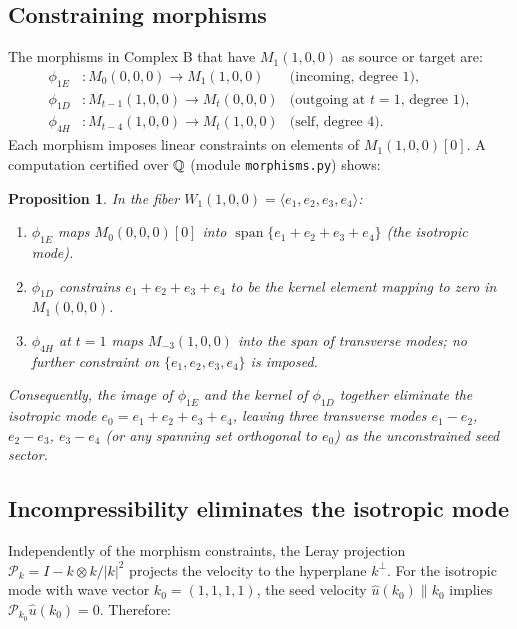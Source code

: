 \documentclass[reqno,10pt]{amsart}
\theoremstyle{plain}
\newtheorem{proposition}[theorem]{Proposition}
\theoremstyle{definition}
\begin{document}
\subsection{Constraining morphisms}

The morphisms in Complex B that have $M_1(1,0,0)$ as source or target are:
\begin{align*}
  \phi_{1E} &: M_0(0,0,0) \to M_1(1,0,0) & \text{(incoming, degree 1)},\\
  \phi_{1D} &: M_{t-1}(1,0,0) \to M_t(0,0,0) & \text{(outgoing at } t=1\text{, degree 1)},\\
  \phi_{4H} &: M_{t-4}(1,0,0) \to M_t(1,0,0) & \text{(self, degree 4)}.
\end{align*}
Each morphism imposes linear constraints on elements of $M_1(1,0,0)[0]$.
A computation certified over ${\mathbb{Q}}$ (module \texttt{morphisms.py}) shows:

\begin{proposition}\label{prop:constraints}
  In the fiber $W_1(1,0,0) = \langle e_1,e_2,e_3,e_4\rangle$:
  \begin{enumerate}
    \item[\rm(i)] $\phi_{1E}$ maps $M_0(0,0,0)[0]$ into $\operatorname{span}\{e_1+e_2+e_3+e_4\}$
          (the isotropic mode).
    \item[\rm(ii)] $\phi_{1D}$ constrains $e_1+e_2+e_3+e_4$ to be the kernel element
          mapping to zero in $M_1(0,0,0)$.
    \item[\rm(iii)] $\phi_{4H}$ at $t=1$ maps $M_{-3}(1,0,0)$ into the span of
          transverse modes; no further constraint on $\{e_1,e_2,e_3,e_4\}$ is imposed.
  \end{enumerate}
  Consequently, the image of $\phi_{1E}$ and the kernel of $\phi_{1D}$ together
  eliminate the isotropic mode $e_0 = e_1+e_2+e_3+e_4$, leaving three
  transverse modes $e_1-e_2$, $e_2-e_3$, $e_3-e_4$ (or any spanning set
  orthogonal to $e_0$) as the unconstrained seed sector.
\end{proposition}

\subsection{Incompressibility eliminates the isotropic mode}

Independently of the morphism constraints, the Leray projection
$\mathcal{P}_k = I - k \otimes k / |k|^2$ projects the velocity to the
hyperplane $k^\perp$.  For the isotropic mode with wave vector
$k_0 = (1,1,1,1)$, the seed velocity $\hat{u}(k_0) \parallel k_0$ implies
$\mathcal{P}_{k_0} \hat{u}(k_0) = 0$.  Therefore:
\end{document}
